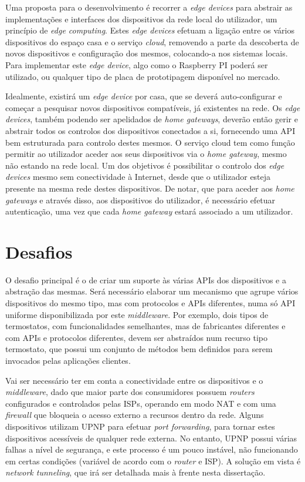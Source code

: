 Uma proposta para o desenvolvimento é recorrer a \textit{edge devices} para abstrair as implementações e interfaces dos dispositivos da rede local do utilizador, um princípio de \textit{edge computing}. Estes \textit{edge devices} efetuam a ligação entre os vários dispositivos do espaço casa e o serviço \textit{cloud}, removendo a parte da descoberta de novos dispositivos e configuração dos mesmos, colocando-a nos sistemas locais. Para implementar este \textit{edge device}, algo como o Raspberry PI poderá ser utilizado, ou qualquer tipo de placa de prototipagem disponível no mercado.

Idealmente, existirá um \textit{edge device} por casa, que se deverá auto-configurar e começar a pesquisar novos dispositivos compatíveis, já existentes na rede. Os \textit{edge devices}, também podendo ser apelidados de \textit{home gateways}, deverão então gerir e abstrair todos os controlos dos dispositivos conectados a si, fornecendo uma API bem estruturada para controlo destes mesmos. O serviço cloud tem como função permitir ao utilizador aceder aos seus dispositivos via o \textit{home gateway}, mesmo não estando na rede local. Um dos objetivos é possibilitar o controlo dos \textit{edge devices} mesmo sem conectividade à Internet, desde que o utilizador esteja presente na mesma rede destes dispositivos. De notar, que para aceder aos \textit{home gateways} e através disso, aos dispositivos do utilizador, é necessário efetuar autenticação, uma vez que cada \textit{home gateway} estará associado a um utilizador.

\section{Desafios}

O desafio principal é o de criar um suporte às várias APIs dos dispositivos e a abstração das mesmas. Será necessário elaborar um mecanismo que agrupe vários dispositivos do mesmo tipo, mas com protocolos e APIs diferentes, numa só API uniforme disponibilizada por este \textit{middleware}. Por exemplo, dois tipos de termostatos, com funcionalidades semelhantes, mas de fabricantes diferentes e com APIs e protocolos diferentes, devem ser abstraídos num recurso tipo termostato, que possui um conjunto de métodos bem definidos para serem invocados pelas aplicações clientes.

Vai ser necessário ter em conta a conectividade entre os dispositivos e o \textit{middleware}, dado que maior parte dos consumidores possuem \textit{routers} configurados e controlados pelas ISPs, operando em modo NAT e com uma \textit{firewall} que bloqueia o acesso externo a recursos dentro da rede. Alguns dispositivos utilizam UPNP para efetuar \textit{port forwarding}, para tornar estes dispositivos acessíveis de qualquer rede externa. No entanto, UPNP possui várias falhas a nível de segurança, e este processo é um pouco instável, não funcionando em certas condições (variável de acordo com o \textit{router} e ISP). A solução em vista é \textit{network tunneling}, que irá ser detalhada mais à frente nesta dissertação.

